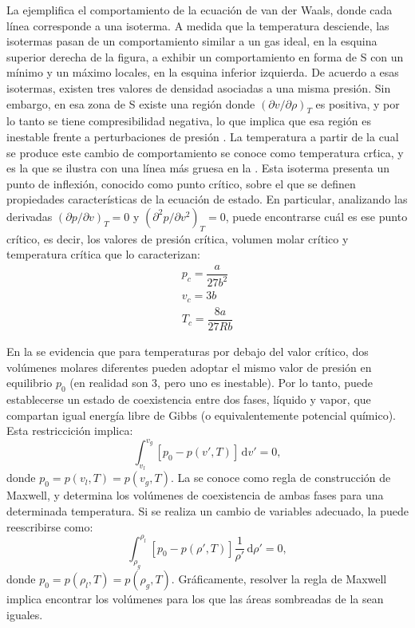 La  ejemplifica el comportamiento de la ecuaci\'on de van der Waals, donde cada l\'inea corresponde a una isoterma. A medida que la temperatura desciende, las isotermas pasan de un comportamiento similar a un gas ideal, en la esquina superior derecha de la figura, a exhibir un comportamiento en forma de S con un m\'inimo y un m\'aximo locales, en la esquina inferior izquierda. De acuerdo a esas isotermas, existen tres valores de densidad asociadas a una misma presi\'on. Sin embargo, en esa zona de S existe una regi\'on donde $(\partial v / \partial \rho)_T$ es positiva, y por lo tanto se tiene compresibilidad negativa, lo que implica que esa regi\'on es inestable frente a perturbaciones de presi\'on \cite{blundell_concepts_2006}.
La temperatura a partir de la cual se produce este cambio de comportamiento se conoce como temperatura cr\'tica, y es la que se ilustra con una l\'inea m\'as gruesa en la . Esta isoterma presenta un punto de inflexi\'on, conocido como punto cr\'itico, sobre el que se definen propiedades caracter\'isticas de la ecuaci\'on de estado. En particular, analizando las derivadas $(\partial p / \partial v)_T = 0$ y $(\partial^2 p / \partial v^2)_T = 0$, puede encontrarse cu\'al es ese punto cr\'itico, es decir, los valores de presi\'on cr\'itica, volumen molar cr\'itico y temperatura cr\'itica que lo caracterizan:
\begin{equation}
	\begin{gathered}
		p_c = \dfrac{a}{27 b^2} \\
		v_c = 3b \\
		T_c = \dfrac{8 a}{27 R b}
	\end{gathered}
	\label{eq:vdw_param_crit}
\end{equation}

En la  se evidencia que para temperaturas por debajo del valor cr\'itico, dos vol\'umenes molares diferentes pueden adoptar el mismo valor de presi\'on en equilibrio $p_0$ (en realidad son 3, pero uno es inestable). Por lo tanto, puede establecerse un estado de coexistencia entre dos fases, l\'iquido y vapor, que compartan igual energ\'ia libre de Gibbs (o equivalentemente potencial qu\'imico). Esta restriccici\'on implica:
\begin{equation}
	\int_{v_l}^{v_g} \left[p_0 - p(v',T)\right] \, \mbox{d} v' = 0,
	\label{eq:maxwell_constr}
\end{equation}
donde $p_0 = p(v_l,T) = p(v_g,T)$. La  se conoce como regla de construcci\'on de Maxwell, y determina los vol\'umenes de coexistencia de ambas fases para una determinada temperatura. Si se realiza un cambio de variables adecuado, la  puede reescribirse como:
\begin{equation}
	\int_{\rho_g}^{\rho_l} \left[p_0 - p(\rho',T)\right] \dfrac{1}{\rho'} \, \mbox{d} \rho' = 0,
	\label{eq:maxwell_constr_rho}
\end{equation}
donde $p_0 = p(\rho_l,T) = p(\rho_g,T)$. Gr\'aficamente, resolver la regla de Maxwell implica encontrar los vol\'umenes para los que las \'areas sombreadas de la  sean iguales. 

